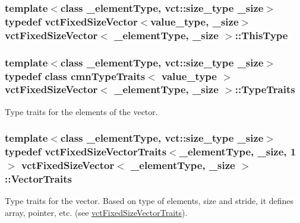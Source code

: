 \hypertarget{classvct_fixed_size_vector_ab843a1db4f68a04960de8f4fea28adda}{
\subsubsection[{This\-Type}]{\setlength{\rightskip}{0pt plus 5cm}template$<$class \-\_\-element\-Type, vct\-::size\-\_\-type \-\_\-size$>$ typedef {\bf vct\-Fixed\-Size\-Vector}$<$value\-\_\-type, \-\_\-size$>$ {\bf vct\-Fixed\-Size\-Vector}$<$ \-\_\-element\-Type, \-\_\-size $>$\-::{\bf This\-Type}}}\label{classvct_fixed_size_vector_ab843a1db4f68a04960de8f4fea28adda}
\hypertarget{classvct_fixed_size_vector_a31021c195f3f1ccf57f4bede713bd629}{
\subsubsection[{Type\-Traits}]{\setlength{\rightskip}{0pt plus 5cm}template$<$class \-\_\-element\-Type, vct\-::size\-\_\-type \-\_\-size$>$ typedef class {\bf cmn\-Type\-Traits}$<$ value\-\_\-type $>$ {\bf vct\-Fixed\-Size\-Vector}$<$ \-\_\-element\-Type, \-\_\-size $>$\-::{\bf Type\-Traits}}}\label{classvct_fixed_size_vector_a31021c195f3f1ccf57f4bede713bd629}
Type traits for the elements of the vector. \hypertarget{classvct_fixed_size_vector_a82ab46671bc55178f97dd3245aed0600}{
\subsubsection[{Vector\-Traits}]{\setlength{\rightskip}{0pt plus 5cm}template$<$class \-\_\-element\-Type, vct\-::size\-\_\-type \-\_\-size$>$ typedef {\bf vct\-Fixed\-Size\-Vector\-Traits}$<$\-\_\-element\-Type, \-\_\-size, 1$>$ {\bf vct\-Fixed\-Size\-Vector}$<$ \-\_\-element\-Type, \-\_\-size $>$\-::{\bf Vector\-Traits}}}\label{classvct_fixed_size_vector_a82ab46671bc55178f97dd3245aed0600}
Type traits for the vector. Based on type of elements, size and stride, it defines array, pointer, etc. (see \hyperlink{classvct_fixed_size_vector_traits}{vct\-Fixed\-Size\-Vector\-Traits}). 

